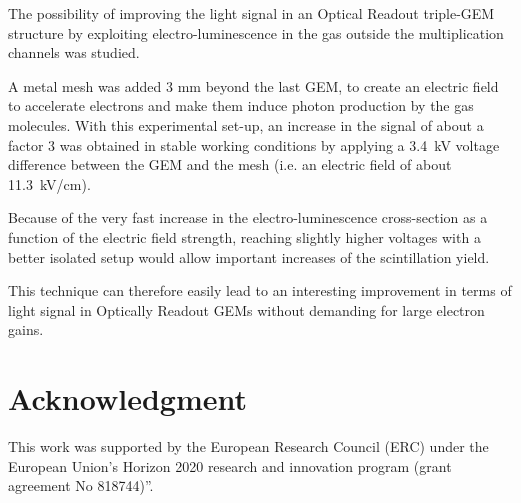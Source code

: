 \documentclass[a4paper,11pt]{article}
\begin{document}
The possibility of improving the light signal in an Optical Readout triple-GEM structure by exploiting electro-luminescence in the gas outside the multiplication channels was studied.

A metal mesh was added 3 mm beyond the last GEM, to create an electric field to accelerate electrons and make them induce photon production by the gas molecules.
With this experimental set-up, an increase in the signal of about a factor 3 was obtained in stable working conditions by applying a 3.4~kV  voltage difference between the GEM and the mesh (i.e. an electric field of about 11.3~kV/cm).

Because of the very fast increase in the electro-luminescence cross-section as a function of the electric field strength, 
reaching slightly higher voltages with a better isolated setup would allow important increases of the scintillation yield. 

This technique can therefore easily lead to an interesting improvement in terms of light 
signal in Optically Readout GEMs without demanding for large electron gains.

\section*{Acknowledgment}
This work was supported by the European Research Council (ERC) under the European Union’s Horizon 2020 research and innovation program (grant agreement No 818744)”.



{}

\end{document}
